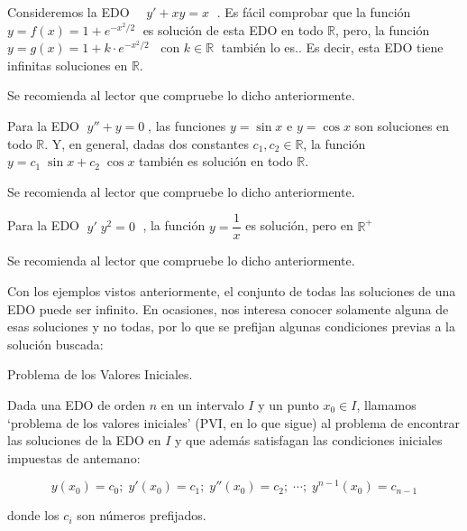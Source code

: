 \begin{cuadro-gris}
\begin{ejem}
Consideremos la EDO $\quad y'+xy=x\; $	. Es fácil comprobar que la función $y=f(x)=1+e^{-{x^2}/2}\; $ es solución de esta EDO en todo $\mathbb R$, pero, la función $y=g(x)=1+k\cdot e^{-{x^2}/2}\; \; \text{ con } k\in \mathbb R \; $ también lo es.. Es decir, esta EDO tiene infinitas soluciones en $\mathbb R$.

Se recomienda al lector que compruebe lo dicho anteriormente.
\end{ejem}
\end{cuadro-gris}

\begin{cuadro-gris}
\begin{ejem}
Para la EDO $\; y''+y=0\; $, las funciones $y=\sin x$ e $y=\cos x$ son soluciones en todo $\mathbb R$. Y, en general, dadas dos constantes $c_1, c_2 \in \mathbb R$, la función $y=c_1\; \sin x + c_2 \; \cos x$ también es solución en todo $\mathbb R$.

Se recomienda al lector que compruebe lo dicho anteriormente.
\end{ejem}
\end{cuadro-gris}

\begin{cuadro-gris}
\begin{ejem}
Para la EDO $\; y'\; y^2=0 \;$	, la función $y=\dfrac 1 x$ es solución, pero en $\mathbb R^+$

Se recomienda al lector que compruebe lo dicho anteriormente.
\end{ejem}
\end{cuadro-gris}

Con los ejemplos vistos anteriormente, el conjunto de todas las soluciones de una EDO puede ser infinito. En ocasiones, nos interesa conocer solamente alguna de esas soluciones y no todas, por lo que se prefijan algunas condiciones previas a la solución buscada:

\begin{cuadro-naranja}

\begin{defi}{Problema de los Valores Iniciales.}

Dada una EDO de orden $n$ en un intervalo $I$ y un punto $x_0\in I$, llamamos `problema de los valores iniciales' (PVI, en lo que sigue) al problema de encontrar las soluciones de la EDO en $I$ y que además satisfagan las condiciones iniciales impuestas de antemano:

\begin{equation*}
	y(x_0)=c_0; \; y'(x_0)=c_1; \; y''(x_0)=c_2; \; \cdots ; \; y^{n-1}(x_0)=c_{n-1}
\end{equation*}

donde los $c_i$ son números prefijados.
\end{defi}
\end{cuadro-naranja}

